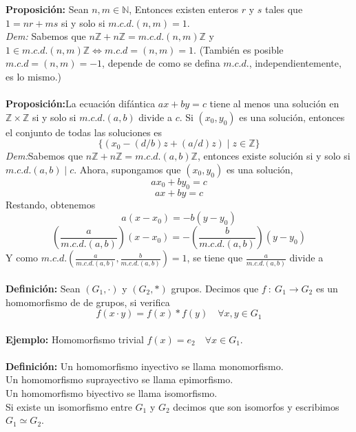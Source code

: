 \documentclass{article}
\newcommand{\bb}[1]{\mathbb{#1}}
\newcommand{\p}[0]{\textbf{Proposición:}}
\newcommand{\dem}[0]{\textit{Dem:}}
\begin{document}

\textbf{Proposición:} Sean $n,m\in\mathbb{N}$, Entonces existen enteros $r$ y $s$ tales que $1=nr+ms$ si y solo si $m.c.d.(n,m)=1$.\\
\textit{Dem:} Sabemos que $n\mathbb{Z}+n\mathbb{Z}=m.c.d.(n,m)\mathbb{Z}$ y $1\in m.c.d.(n,m)\mathbb{Z}\Leftrightarrow m.c.d=(n,m)=1$. (También es posible $m.c.d=(n,m)=-1$, depende de como se defina $m.c.d.$, independientemente, es lo mismo.)\\\\


\p La ecuación difántica $ax+by=c$ tiene al menos una solución en $\bb{Z}\times\bb{Z}$ si y solo si $m.c.d.(a,b)$ divide a $c$. Si $(x_0,y_0)$ es una solución, entonces el conjunto de todas las soluciones es
$$
\{ (x_0-(d/b)z+(a/d)z)\mid z\in \bb{Z}\}
$$
\dem Sabemos que $n\mathbb{Z}+n\mathbb{Z}=m.c.d.(a,b)\mathbb{Z}$, entonces existe solución si y solo si $m.c.d.(a,b)\mid c$. Ahora, supongamos que $(x_0,y_0)$ es una solución,
$$
ax_0+by_0=c
$$
$$
ax+by=c
$$
Restando, obtenemos
$$
a(x-x_0)=-b(y-y_0)
$$
$$
(\frac{a}{m.c.d.(a,b)})(x-x_0)=-(\frac{b}{m.c.d.(a,b)})(y-y_0)
$$
Y como $m.c.d.(\frac{a}{m.c.d.(a,b)},\frac{b}{m.c.d.(a,b)})=1$, se tiene que $\frac{a}{m.c.d.(a,b)}$ divide a %
\\\\

\textbf{Definición:} Sean $(G_1,\cdot)$ y $(G_2,*)$ grupos. Decimos que $f\::\:G_1\longrightarrow G_2$ es un homomorfismo de de grupos, si verifica
$$
f(x\cdot y)=f(x)*f(y)\quad\forall x,y\in G_1
$$\\



\textbf{Ejemplo:} Homomorfismo trivial $f(x)=e_2 \quad \forall x\in G_1$.\\\\


\textbf{Definición:} Un homomorfismo inyectivo se llama monomorfismo.\\
Un homomorfismo suprayectivo se llama epimorfismo.\\
Un homomorfismo biyectivo se llama isomorfismo.\\
Si existe un isomorfismo entre $G_1$ y $G_2$ decimos que son isomorfos y escribimos $G_1\simeq G_2$.\\\\
\end{document}
